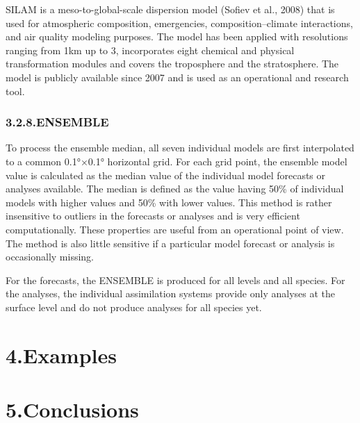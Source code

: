 \documentclass[9pt]{report}
\begin{document}
\noindent{}SILAM is a meso-to-global-scale dispersion model (Sofiev et al., 2008) that is used for atmospheric composition, emergencies, composition–climate interactions, and air quality modeling purposes. 
The model has been applied with resolutions ranging from 1km up to 3\textdegree{}, incorporates eight chemical and physical transformation modules and covers the troposphere and the stratosphere. 
The model is publicly available since 2007 and is used as an operational and research tool.%

\subsubsection{3.2.8.\hspace*{0.5em}ENSEMBLE}\label{sec-ensemble}%

\noindent{}To process the ensemble median, all seven individual models are first interpolated to a common 0.1°×0.1° horizontal grid. 
For each grid point, the ensemble model value is calculated as the median value of the individual model forecasts or analyses available. 
The median is defined as the value having 50\% of individual models with higher values and 50\% with lower values. 
This method is rather insensitive to outliers in the forecasts or analyses and is very efficient computationally. 
These properties are useful from an operational point of view. 
The method is also little sensitive if a particular model forecast or analysis is occasionally missing.%

 For the forecasts, the ENSEMBLE is produced for all levels and all species. 
 For the analyses, the individual assimilation systems provide only analyses at the surface level and do not produce analyses for all species yet.%

\section{4.\hspace*{0.5em}Examples}\label{sec-examples}%

\section{5.\hspace*{0.5em}Conclusions}\label{sec-conclusions}%
\end{document}
